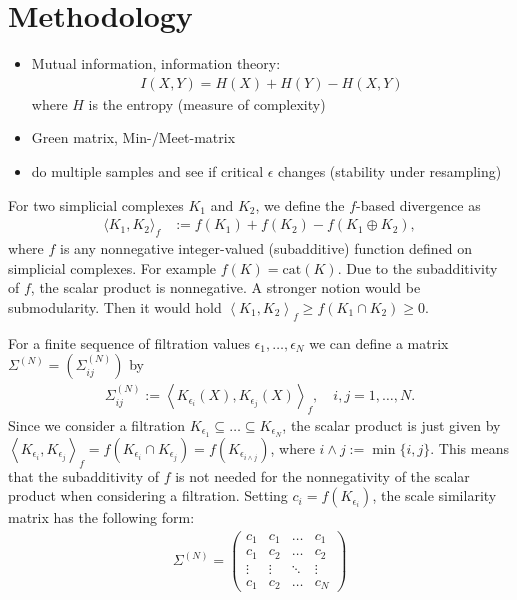 \chapter{Methodology}\label{chap:methodology}

\begin{itemize}
    \item Mutual information, information theory:
    \begin{align*}
        I(X,Y)=H(X)+H(Y)-H(X,Y)
    \end{align*}
    where $H$ is the entropy (measure of complexity)
    \item Green matrix, Min-/Meet-matrix
    \item do multiple samples and see if critical $\epsilon$ changes (stability under resampling)
\end{itemize}

For two simplicial complexes $K_1$ and $K_2$, we define the $f$-based divergence as
\begin{align*}
    \langle K_1,K_2\rangle_f&:=f(K_1)+f(K_2)-f(K_1\oplus K_2),
\end{align*}
where $f$ is any nonnegative integer-valued (subadditive) function defined on simplicial complexes. For example $f(K)=\text{cat}(K)$. Due to the subadditivity of $f$, the scalar product is nonnegative. A stronger notion would be submodularity. Then it would hold $\left\langle K_1,K_2\right\rangle_f\ge f(K_1\cap K_2)\ge0$.


For a finite sequence of filtration values $\epsilon_1,\dots,\epsilon_N$ we can define a matrix $\Sigma^{(N)}=(\Sigma^{(N)}_{ij})$ by
\begin{align*}
    \Sigma^{(N)}_{ij}:=\left\langle K_{\epsilon_i}(X),K_{\epsilon_j}(X)\right\rangle_f,\quad i,j=1,\dots,N.
\end{align*}
Since we consider a filtration $K_{\epsilon_1}\subseteq\dots\subseteq K_{\epsilon_{N}}$, the scalar product is just given by $\left\langle K_{\epsilon_i},K_{\epsilon_j}\right\rangle_f=f(K_{\epsilon_i}\cap K_{\epsilon_j})=f(K_{\epsilon_{i\wedge j}})$, where $i\wedge j:=\min\{i,j\}$. This means that the subadditivity of $f$ is not needed for the nonnegativity of the scalar product when considering a filtration. Setting $c_i=f(K_{\epsilon_i})$, the scale similarity matrix has the following form:
\begin{align}\label{eq:Sigma_form}
    \Sigma^{(N)}=\begin{pmatrix}
        c_1 & c_1 & \dots & c_1\\
        c_1 & c_2 & \dots & c_2\\
        \vdots & \vdots & \ddots & \vdots\\
        c_1 & c_2 & \dots & c_N
    \end{pmatrix}
\end{align}


